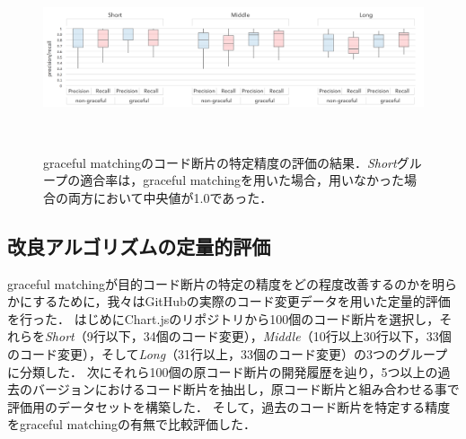 \begin{figure}[t]
  \centering
  \includegraphics[width=2.0\columnwidth]{evaluate/difftrack_eval_commit.png}
  \caption{graceful matchingのコード断片の特定精度の評価の結果．\textit{Short}グループの適合率は，graceful matchingを用いた場合，用いなかった場合の両方において中央値が1.0であった．}~\label{fig:Commit_Matching_Accuracy_Evaluation}
  \vspace{-5mm}
\end{figure}

\subsection{改良アルゴリズムの定量的評価}

graceful matchingが目的コード断片の特定の精度をどの程度改善するのかを明らかにするために，我々はGitHubの実際のコード変更データを用いた定量的評価を行った．
はじめにChart.jsのリポジトリから100個のコード断片を選択し，それらを\textit{Short}（9行以下，34個のコード変更），\textit{Middle}（10行以上30行以下，33個のコード変更），そして\textit{Long}（31行以上，33個のコード変更）の3つのグループに分類した．
次にそれら100個の原コード断片の開発履歴を辿り，5つ以上の過去のバージョンにおけるコード断片を抽出し，原コード断片と組み合わせる事で評価用のデータセットを構築した．
そして，過去のコード断片を特定する精度をgraceful matchingの有無で比較評価した．



